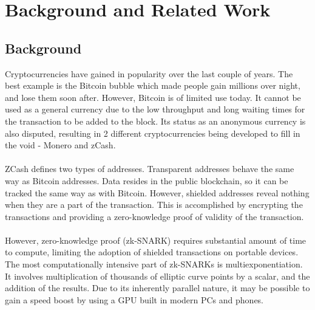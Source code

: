 
\chapter{Background and Related Work} %

\label{Chapter2} %


\section{Background}

Cryptocurrencies have gained in popularity over the last couple of years. The best example is the Bitcoin bubble which made people gain millions over night, and lose them soon after. However, Bitcoin is of limited use today. It cannot be used as a general currency due to the low throughput and long waiting times for the transaction to be added to the block. Its status as an anonymous currency is also disputed, resulting in 2 different cryptocurrencies being developed to fill in the void - Monero\cite{monero} and zCash\cite{zcashprotocol}.\\
\\
ZCash defines two types of addresses. Transparent addresses behave the same way as Bitcoin addresses. Data resides in the public blockchain, so it can be tracked the same way as with Bitcoin. However, shielded addresses reveal nothing when they are a part of the transaction. This is accomplished by encrypting the transactions and providing a zero-knowledge proof of validity of the transaction\cite{zcashtechnology}.\\
\\
However, zero-knowledge proof (zk-SNARK\cite{zcashzksnarks}) requires substantial amount of time to compute, limiting the adoption of shielded transactions on portable devices. The most computationally intensive part of zk-SNARKs is multiexponentiation. It involves multiplication of thousands of elliptic curve points by a scalar, and the addition of the results. Due to its inherently parallel nature, it may be possible to gain a speed boost by using a GPU built in modern PCs and phones.



